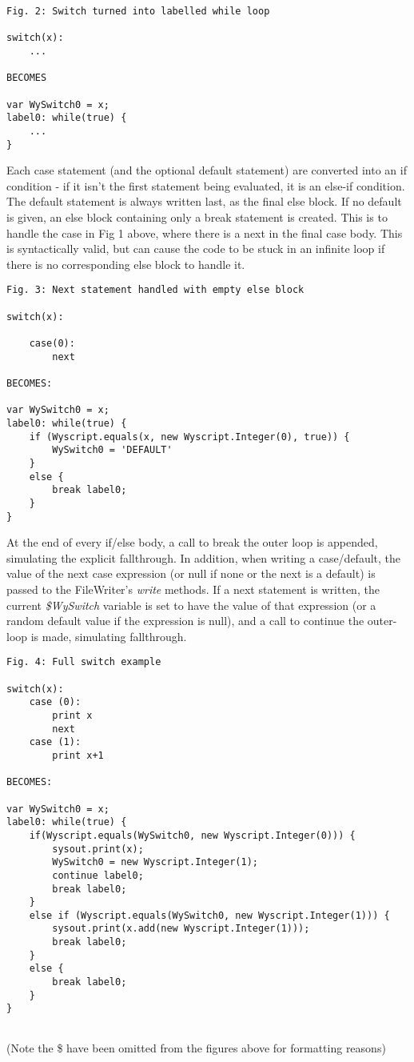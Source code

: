 \begin{lstlisting}
Fig. 2: Switch turned into labelled while loop

switch(x):
    ...

BECOMES

var WySwitch0 = x;
label0: while(true) {
    ...
}
\end{lstlisting}

Each case statement (and the optional default statement) are converted into an if condition - if it isn't the first statement being evaluated, it is an else-if condition. The default statement is always written last, as the final else block. If no default is given, an else block containing only a break statement is created. This is to handle the case in Fig 1 above, where there is a next in the final case body. This is syntactically valid, but can cause the code to be stuck in an infinite loop if there is no corresponding else block to handle it.\\

\begin{lstlisting}
Fig. 3: Next statement handled with empty else block

switch(x):

    case(0):
        next

BECOMES:

var WySwitch0 = x;
label0: while(true) {
    if (Wyscript.equals(x, new Wyscript.Integer(0), true)) {
        WySwitch0 = 'DEFAULT'
    }
    else {
        break label0;
    }
}
\end{lstlisting}

At the end of every if/else body, a call to break the outer loop is appended, simulating the explicit fallthrough. In addition, when writing a case/default, the value of the next case expression (or null if none or the next is a default) is passed to the FileWriter's {\em write} methods. If a next statement is written, the current {\em \$WySwitch} variable is set to have the value of that expression (or a random default value if the expression is null), and a call to continue the outer-loop is made, simulating fallthrough.\pagebreak

\begin{lstlisting}
Fig. 4: Full switch example

switch(x):
    case (0):
        print x
        next
    case (1):
        print x+1

BECOMES:

var WySwitch0 = x;
label0: while(true) {
    if(Wyscript.equals(WySwitch0, new Wyscript.Integer(0))) {
        sysout.print(x);
        WySwitch0 = new Wyscript.Integer(1);
        continue label0;
        break label0;
    }
    else if (Wyscript.equals(WySwitch0, new Wyscript.Integer(1))) {
        sysout.print(x.add(new Wyscript.Integer(1)));
        break label0;
    }
    else {
        break label0;
    }
}
    
\end{lstlisting}
(Note the \$ have been omitted from the figures above for formatting reasons)

